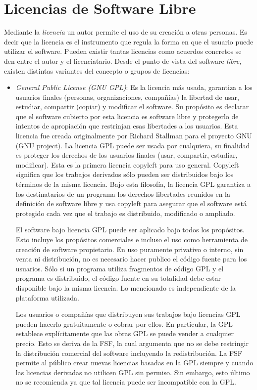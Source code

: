 \section{Licencias de Software Libre}

Mediante la \textit{licencia} un autor permite el uso de su creación a
otras personas. Es decir que la licencia es el instrumento que regula
la forma en que el usuario puede utilizar el software. Pueden existir
tantas licencias como acuerdos concretos se den entre el autor y el
licenciatario. Desde el punto de vista del software \textit{libre},
existen distintas variantes del concepto o grupos de licencias:

\begin {itemize}
\item \textit{General Public License (GNU GPL)}: Es la licencia más
  usada, garantiza a los usuarios finales (personas, organizaciones,
  compañías) la libertad de usar, estudiar, compartir (copiar) y
  modificar el software. Su propósito es declarar que el software
  cubierto por esta licencia es software libre y protegerlo de
  intentos de apropiación que restrinjan esas libertades a los
  usuarios. Esta licencia fue creada originalmente por Richard
  Stallman para el proyecto GNU (GNU project). La licencia GPL puede
  ser usada por cualquiera, su finalidad es proteger los derechos de
  los usuarios finales (usar, compartir, estudiar, modificar). Esta es
  la primera licencia copyleft para uso general. Copyleft significa
  que los trabajos derivados sólo pueden ser distribuidos bajo los
  términos de la misma licencia. Bajo esta filosofía, la licencia GPL
  garantiza a los destinatarios de un programa los derechos-libertades
  reunidos en la definición de software libre y usa copyleft para
  asegurar que el software está protegido cada vez que el trabajo es
  distribuido, modificado o ampliado.

  El software bajo licencia GPL puede ser aplicado bajo todos los
  propósitos. Esto incluye los propósitos comerciales e incluso el uso
  como herramienta de creación de software propietario. En uso
  puramente privativo o interno, sin venta ni distribución, no es
  necesario hacer publico el código fuente para los usuarios. Sólo si
  un programa utiliza fragmentos de código GPL y el programa es
  distribuido, el código fuente en su totalidad debe estar disponible
  bajo la misma licencia. Lo mencionado es independiente de la
  plataforma utilizada. 

  Los usuarios o compañías que distribuyen sus trabajos bajo licencias
  GPL pueden hacerlo gratuitamente o cobrar por ellos. En particular,
  la GPL establece explícitamente que las obras GPL se puede vender a
  cualquier precio. Esto se deriva de la FSF, la cual argumenta que no
  se debe restringir la distribución comercial del software incluyendo
  la redistribución. La FSF permite al público crear nuevas licencias
  basadas en la GPL siempre y cuando las licencias derivadas no
  utilicen GPL sin permiso. Sin embargo, esto último no se recomienda
  ya que tal licencia puede ser incompatible con la GPL.


\end{itemize}
